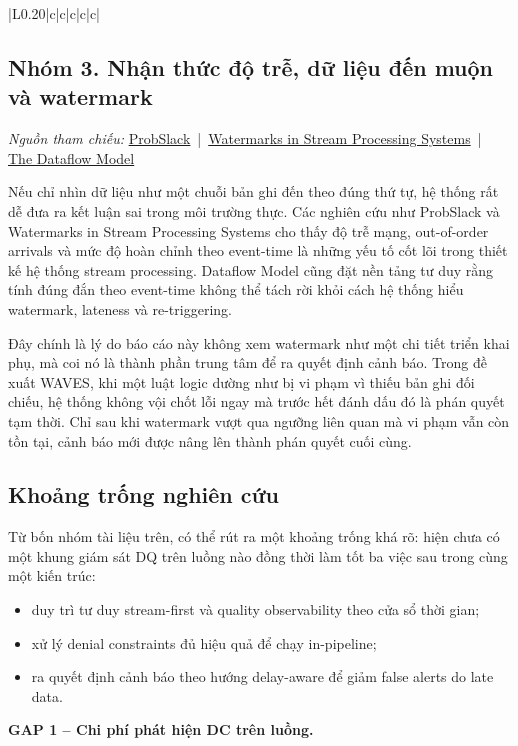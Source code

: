 {\begin{longtable}{|L{0.20\textwidth}|c|c|c|c|c|}
\subsection*{Nhóm 3. Nhận thức độ trễ, dữ liệu đến muộn và watermark}

\noindent \textit{Nguồn tham chiếu: }
\href{https://dl.acm.org/doi/10.1145/3210284.3210293}{ProbSlack} \,|\, \href{https://dl.acm.org/doi/10.14778/3476311.3476389}{Watermarks in Stream Processing Systems} \,|\, \href{https://research.google.com/pubs/archive/43864.pdf}{The Dataflow Model}

Nếu chỉ nhìn dữ liệu như một chuỗi bản ghi đến theo đúng thứ tự, hệ thống rất dễ đưa ra kết luận sai trong môi trường thực. Các nghiên cứu như ProbSlack và Watermarks in Stream Processing Systems cho thấy độ trễ mạng, out-of-order arrivals và mức độ hoàn chỉnh theo event-time là những yếu tố cốt lõi trong thiết kế hệ thống stream processing. Dataflow Model cũng đặt nền tảng tư duy rằng tính đúng đắn theo event-time không thể tách rời khỏi cách hệ thống hiểu watermark, lateness và re-triggering.

Đây chính là lý do báo cáo này không xem watermark như một chi tiết triển khai phụ, mà coi nó là thành phần trung tâm để ra quyết định cảnh báo. Trong đề xuất WAVES, khi một luật logic dường như bị vi phạm vì thiếu bản ghi đối chiếu, hệ thống không vội chốt lỗi ngay mà trước hết đánh dấu đó là phán quyết tạm thời. Chỉ sau khi watermark vượt qua ngưỡng liên quan mà vi phạm vẫn còn tồn tại, cảnh báo mới được nâng lên thành phán quyết cuối cùng.

\subsection*{Khoảng trống nghiên cứu}

Từ bốn nhóm tài liệu trên, có thể rút ra một khoảng trống khá rõ: hiện chưa có một khung giám sát DQ trên luồng nào đồng thời làm tốt ba việc sau trong cùng một kiến trúc:
\begin{itemize}
  \item duy trì tư duy stream-first và quality observability theo cửa sổ thời gian;
  \item xử lý denial constraints đủ hiệu quả để chạy in-pipeline;
  \item ra quyết định cảnh báo theo hướng delay-aware để giảm false alerts do late data.
\end{itemize}

\textbf{GAP 1 -- Chi phí phát hiện DC trên luồng.}


\end{longtable}}
